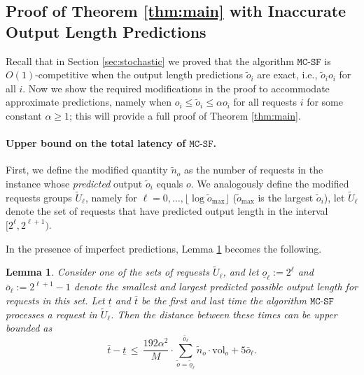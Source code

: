 \documentclass[11pt, a4paper]{article}
\theoremstyle{plain}
\newtheorem{lemma}[theorem]{Lemma}
\theoremstyle{definition}
\theoremstyle{remark}
\newcommand{\mcsdf}{\texttt{MC-SF}}
\newcommand{\vol}{\textrm{vol}}
\newcommand{\alg}{\mcsdf}
\newcommand{\po}{\tilde{o}}
\begin{document}

\subsection{Proof of Theorem \ref{thm:main} with Inaccurate Output Length Predictions} \label{app:stochastic}

Recall that in Section \ref{sec:stochastic} we proved that the algorithm $\alg$ is $O(1)$-competitive when the output length predictions $\po_i$ are exact, i.e., $\po_i o_i$ for all $i$. Now we show the required modifications in the proof to accommodate approximate predictions, namely when $o_i \le \po_i \le \alpha o_i$ for all requests $i$ for some constant $\alpha \ge 1$; this will provide a full proof of Theorem \ref{thm:main}.


\paragraph{Upper bound on the total latency of $\alg$.}

First, we define the modified quantity $\tilde{n}_o$ as the number of requests in the instance whose \emph{predicted} output $\po_i$ equals $o$. We analogously define the modified requests groups $\tilde{U}_\ell$, namely for $\ell = 0,\ldots, \lfloor \log \po_{\max} \rfloor$ ($\po_{\max}$ is the largest $\po_i$), let $\tilde{U}_\ell$ denote the set of requests that have predicted output length in the interval $[2^\ell, 2^{\ell + 1})$. 

In the presence of imperfect predictions, Lemma \ref{lemma:UBo2} becomes the following.

\begin{lemma} \label{lemma:UBo2}
	Consider one of the sets of requests $\tilde{U}_\ell$, and let $\underline{o}_\ell := 2^{\ell}$ and $\bar{o}_\ell := 2^{\ell + 1} - 1$ denote the smallest and largest predicted possible output length for requests in this set. Let $\underline{t}$ and $\bar{t}$ be the first and last time the algorithm $\alg$ processes a request in $\tilde{U}_{\ell}$. Then the distance between these times can be upper bounded as 
	$$\bar{t} - \underline{t} \,\le\, \frac{192\alpha^2}{M} \cdot \sum_{\po = \underline{\po}_\ell}^{\bar{o}_\ell} \tilde{n}_o \cdot \vol_o + 5 \bar{o}_\ell.$$
\end{lemma}
\end{document}
